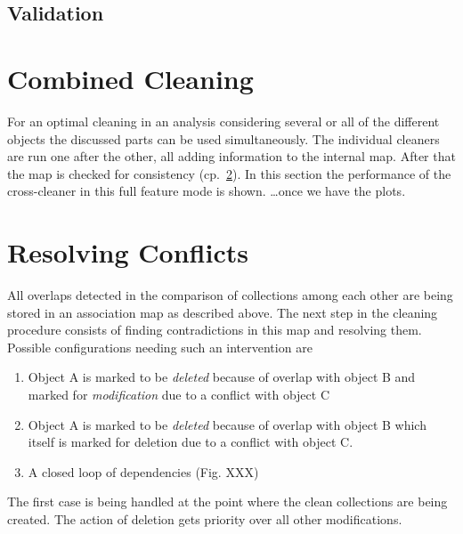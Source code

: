 \documentclass{cmspaper}
\begin{document}
\subsection{Validation}
\clearpage


\section{Combined Cleaning}
For an optimal cleaning in an analysis considering several or all of the
different objects the discussed parts can be used simultaneously. The individual
cleaners are run one after the other, all adding information to the internal
map. After that the map is checked for consistency (cp.~\ref{mapReso}).
In this section the performance of the cross-cleaner in this full feature mode
is shown. \ldots once we have the plots.

\section{Resolving Conflicts}
\label{mapReso}
All overlaps detected in the comparison of collections among each other are
being stored in an association map as described above. The next step in the cleaning procedure
consists of finding contradictions in this map and resolving them.
Possible configurations needing such an intervention are
\begin{enumerate}
    \item Object A is marked to be \textit{deleted} because of overlap with
	object B and marked for \textit{modification} due to a conflict with
	object C
    \item Object A is marked to be \textit{deleted} because of overlap with object B
	which itself is marked for deletion due to a conflict with object C.
    \item A closed loop of dependencies (Fig. XXX) %
\end{enumerate}


The first case is being handled at the point where the clean collections are
being created. The action of deletion gets priority over all other
modifications.
\end{document}
